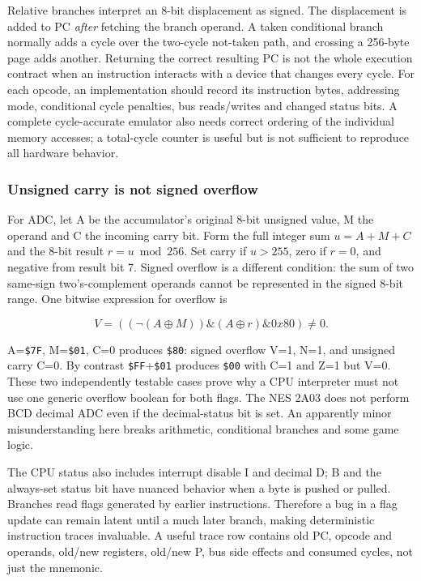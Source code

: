 Relative branches interpret an 8-bit displacement as signed. The displacement is added to PC \emph{after} fetching the branch operand. A taken conditional branch normally adds a cycle over the two-cycle not-taken path, and crossing a 256-byte page adds another. Returning the correct resulting PC is not the whole execution contract when an instruction interacts with a device that changes every cycle. For each opcode, an implementation should record its instruction bytes, addressing mode, conditional cycle penalties, bus reads/writes and changed status bits. A complete cycle-accurate emulator also needs correct ordering of the individual memory accesses; a total-cycle counter is useful but is not sufficient to reproduce all hardware behavior.

\subsubsection{Unsigned carry is not signed overflow}\label{unsigned-carry-is-not-signed-overflow}

For ADC, let A be the accumulator's original 8-bit unsigned value, M the operand and C the incoming carry bit. Form the full integer sum \(u=A+M+C\) and the 8-bit result \(r=u\bmod256\). Set carry if \(u>255\), zero if \(r=0\), and negative from result bit 7. Signed overflow is a different condition: the sum of two same-sign two's-complement operands cannot be represented in the signed 8-bit range. One bitwise expression for overflow is

\[
V= ((\neg(A\oplus M))\mathbin{\&}(A\oplus r)\mathbin{\&}0x80)\ne0.
\]

A=\texttt{\$7F}, M=\texttt{\$01}, C=0 produces \texttt{\$80}: signed overflow V=1, N=1, and unsigned carry C=0. By contrast \texttt{\$FF}+\texttt{\$01} produces \texttt{\$00} with C=1 and Z=1 but V=0. These two independently testable cases prove why a CPU interpreter must not use one generic overflow boolean for both flags. The NES 2A03 does not perform BCD decimal ADC even if the decimal-status bit is set. An apparently minor misunderstanding here breaks arithmetic, conditional branches and some game logic.

The CPU status also includes interrupt disable I and decimal D; B and the always-set status bit have nuanced behavior when a byte is pushed or pulled. Branches read flags generated by earlier instructions. Therefore a bug in a flag update can remain latent until a much later branch, making deterministic instruction traces invaluable. A useful trace row contains old PC, opcode and operands, old/new registers, old/new P, bus side effects and consumed cycles, not just the mnemonic.

